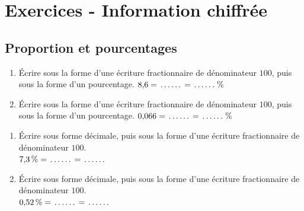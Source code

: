 \bigskip

\newpage

\section*{Exercices - Information chiffrée}
{\setlength{\columnseprule}{0pt}
\setcounter{NumEx}{1}


\subsection*{Proportion et pourcentages}


\begin{Exercice}
\leavevmode\vspace{-\baselineskip}
\begin{enumerate}
	\item Écrire sous la forme d'une écriture fractionnaire de dénominateur $100$, puis sous la forme d'un pourcentage. $8{,}6=\makebox[.08\linewidth]{\dotfill}=\makebox[.08\linewidth]{\dotfill}\,\%$
	\item Écrire sous la forme d'une écriture fractionnaire de dénominateur $100$, puis sous la forme d'un pourcentage. $0{,}066=\makebox[.08\linewidth]{\dotfill}=\makebox[.08\linewidth]{\dotfill}\,\%$
\end{enumerate}
\end{Exercice}

\begin{Exercice}
\leavevmode\vspace{-\baselineskip}
\begin{enumerate}
	\item Écrire sous forme décimale, puis sous la forme d'une écriture fractionnaire de dénominateur $100$.\\
$7{,}3\,\%=\makebox[.08\linewidth]{\dotfill}=\makebox[.08\linewidth]{\dotfill}$
	\item Écrire sous forme décimale, puis sous la forme d'une écriture fractionnaire de dénominateur $100$.\\
$0{,}52\,\%=\makebox[.08\linewidth]{\dotfill}=\makebox[.08\linewidth]{\dotfill}$\\
\end{enumerate}
\end{Exercice}

}
